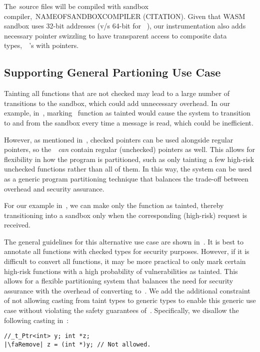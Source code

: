 The~\ucregion source files will be compiled with sandbox compiler,~\ie NAMEOFSANDBOXCOMPILER (CITATION).
Given that WASM sandbox uses 32-bit addresses (v/s 64-bit for~
\cregion), our instrumentation also adds necessary pointer swizzling to have transparent access to composite data types,~\ie~'s with pointers. 

\subsection{Supporting General Partioning Use Case}


Tainting all functions that are not checked may lead to a large number of transitions to the sandbox, which could add unnecessary overhead. In our example, in~, marking~ function as tainted would cause the system to transition to and from the sandbox every time a message is read, which could be inefficient. 

However, as mentioned in~, checked pointers can be used alongside regular pointers, so the~\cregion{}~\emph{can} contain regular (unchecked) pointers as well.
%
This allows for flexibility in how the program is partitioned, such as only tainting a few high-risk unchecked functions rather than all of them. In this way, the system can be used as a generic program partitioning technique that balances the trade-off between overhead and security assurance.

For our example in~, we can make only the function  as tainted, thereby transitioning into a sandbox only when the corresponding (high-risk) request is received.

The general guidelines for this alternative use case are shown in~.
It is best to annotate all functions with checked types for security purposes. However, if it is difficult to convert all functions, it may be more practical to only mark certain high-risk functions with a high probability of vulnerabilities as tainted. This allows for a flexible partitioning system that balances the need for security assurance with the overhead of converting to~\checkedc.
We add the additional constraint of not allowing casting from taint types to generic types to enable this generic use case without violating the safety guarantees of~\systemname.
Specifically, we disallow the following casting in~\cregion:
\begin{verbatim}
//_t_Ptr<int> y; int *z;
|\faRemove| z = (int *)y; // Not allowed.
\end{verbatim}
\iffalse


